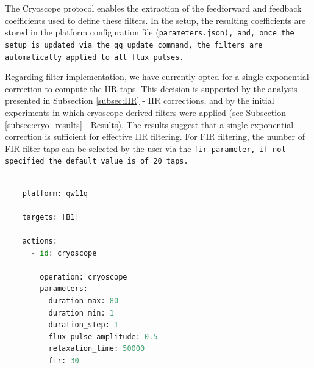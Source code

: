 The Cryoscope protocol enables the extraction of the feedforward and feedback coefficients used to define these filters. 
In the \Qibo setup, the resulting coefficients are stored in the platform configuration file (\tt{parameters.json}), and, once the setup is updated via the \texttt{qq update} command, the filters are automatically applied to all flux pulses.

Regarding filter implementation, we have currently opted for a single exponential correction to compute the IIR taps. 
This decision is supported by the analysis presented in Subsection \ref{subsec:IIR} - IIR corrections, and by the initial experiments in which cryoscope-derived filters were applied (see Subsection \ref{subsec:cryo_results} - Results). 
The results suggest that a single exponential correction is sufficient for effective IIR filtering. 
For FIR filtering, the number of FIR filter taps can be selected by the user via the \tt{fir} parameter, if not specified the default value is of 20 taps. 

\begin{lstlisting}[language=Python, caption={Runcard example to run a Cryoscope experiment.}, label={snippet:cryoscope}]
    
    platform: qw11q

    targets: [B1]

    actions:
      - id: cryoscope 

        operation: cryoscope 
        parameters:
          duration_max: 80
          duration_min: 1
          duration_step: 1
          flux_pulse_amplitude: 0.5
          relaxation_time: 50000
          fir: 30

\end{lstlisting}



